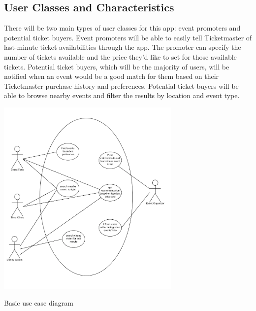 		\subsection{User Classes and Characteristics}
		 There will be two main types of user classes for this app: event promoters and potential ticket buyers. Event promoters will be able to easily tell Ticketmaster of last-minute ticket availabilities through the app. The promoter can specify the number of tickets available and the price they’d like to set for those available tickets. Potential ticket buyers, which will be the majority of users, will be notified when an event would be a good match for them based on their Ticketmaster purchase history and preferences. Potential ticket buyers will be able to browse nearby events and filter the results by location and event type. 
		 \begin{center}
		 	\includegraphics[width=90mm]{./basic_use_case_diagram.png} \\
		 	{\footnotesize Basic use case diagram\par}
		 \end{center}
